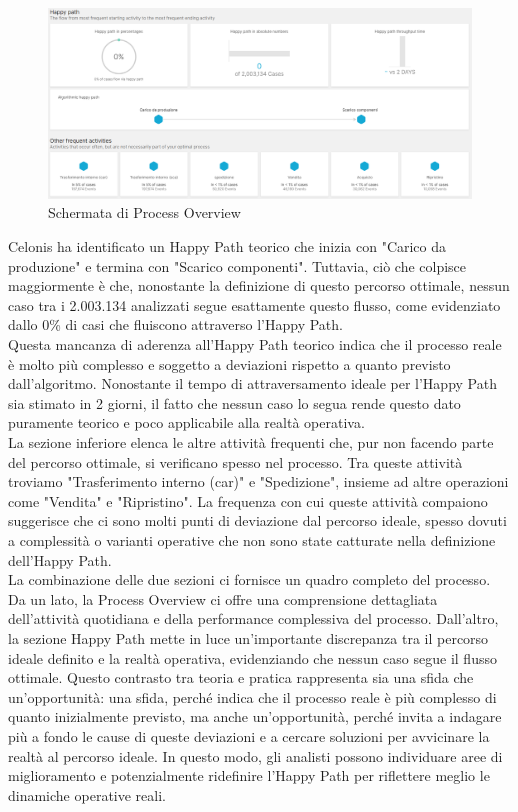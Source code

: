 \documentclass{article}
\begin{document}
\begin{figure}[H]
    \centering
    \includegraphics[width=\textwidth]{imgCelonis/DatiReali/ProcessOverview2.png}
    \caption{Schermata di Process Overview}
    \label{fig:schermata-Process-Overview}
\end{figure}

Celonis ha identificato un Happy Path teorico che inizia con "Carico da produzione" e termina con "Scarico componenti". Tuttavia, ciò che colpisce maggiormente è che, nonostante la definizione di questo percorso ottimale, nessun caso tra i 2.003.134 analizzati segue esattamente questo flusso, come evidenziato dallo 0\% di casi che fluiscono attraverso l'Happy Path.\\
Questa mancanza di aderenza all'Happy Path teorico indica che il processo reale è molto più complesso e soggetto a deviazioni rispetto a quanto previsto dall'algoritmo. Nonostante il tempo di attraversamento ideale per l'Happy Path sia stimato in 2 giorni, il fatto che nessun caso lo segua rende questo dato puramente teorico e poco applicabile alla realtà operativa.\\
La sezione inferiore elenca le altre attività frequenti che, pur non facendo parte del percorso ottimale, si verificano spesso nel processo. Tra queste attività troviamo "Trasferimento interno (car)" e "Spedizione", insieme ad altre operazioni come "Vendita" e "Ripristino". La frequenza con cui queste attività compaiono suggerisce che ci sono molti punti di deviazione dal percorso ideale, spesso dovuti a complessità o varianti operative che non sono state catturate nella definizione dell'Happy Path.\\
La combinazione delle due sezioni ci fornisce un quadro completo del processo. Da un lato, la Process Overview ci offre una comprensione dettagliata dell'attività quotidiana e della performance complessiva del processo. Dall'altro, la sezione Happy Path mette in luce un’importante discrepanza tra il percorso ideale definito e la realtà operativa, evidenziando che nessun caso segue il flusso ottimale. Questo contrasto tra teoria e pratica rappresenta sia una sfida che un'opportunità: una sfida, perché indica che il processo reale è più complesso di quanto inizialmente previsto, ma anche un'opportunità, perché invita a indagare più a fondo le cause di queste deviazioni e a cercare soluzioni per avvicinare la realtà al percorso ideale. In questo modo, gli analisti possono individuare aree di miglioramento e potenzialmente ridefinire l'Happy Path per riflettere meglio le dinamiche operative reali.
\end{document}
